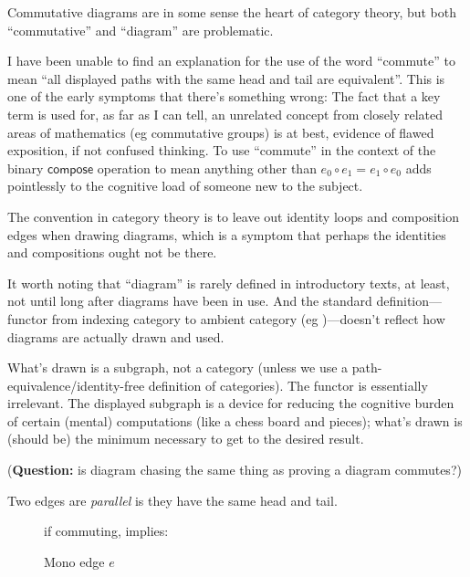 \documentclass[11pt,openany]{article}
\begin{document}
Commutative diagrams are in some sense the heart of category
theory,
but both ``commutative'' and ``diagram'' are problematic.

I have been unable to find an explanation for the use of
the word ``commute'' to mean ``all displayed paths
with the same head and tail are equivalent''.
This is one of the early symptoms that there's something wrong:
The fact that a key term is used for, as far as I can tell, 
an unrelated concept
from closely related areas of mathematics (eg commutative groups)
is at best, evidence of flawed exposition, if not confused thinking.
To use ``commute'' in the context of the binary $\mathsf{compose}$
operation to mean anything other than $e_0 \circ e_1 = e_1 \circ e_0$
adds pointlessly to the cognitive load of someone new to the subject.

The convention in category theory is to leave out identity loops
and composition edges when drawing diagrams,
which is a symptom that perhaps the identities and compositions
ought not be there.

It worth noting that ``diagram'' is rarely defined in introductory
texts, at least, 
not until long after diagrams have been in use.
And the standard definition---functor from indexing category
to ambient category
(eg \cite[][Definition 1.6.4]{riehl2017})---doesn't reflect how
diagrams are actually drawn and used.

What's drawn is a subgraph, not a category (unless we use
a path-equivalence/identity-free definition of categories).
The functor is essentially irrelevant.
The displayed subgraph is a device for 
reducing the cognitive burden of certain (mental) computations
(like a chess board and pieces);
what's drawn is (should be) the minimum necessary 
to get to the desired result.~\cite{dutilh_novaes_2012}

(\textbf{Question:} is diagram chasing the same thing as proving
a diagram commutes?)

\label{sec:mono_epi_iso}

Two edges are \textit{parallel} is they have the same head and tail.

\begin{figure}
\centering
{}
if commuting, implies:
\caption{Mono edge $e$}
\label{fig:mono}
\end{figure}
\end{document}
